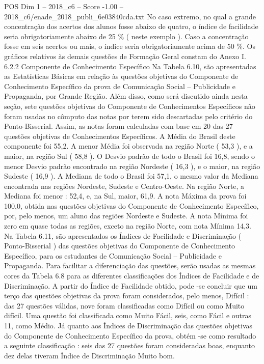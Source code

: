 \begin{textsample}{POS Dim 1 – 2018\_c6 – Score -1.00 – 2018\_c6/enade\_2018\_publi\_6e03840cda.txt}
No caso extremo, no qual a grande concentração dos acertos dos alunos fosse abaixo de quatro, o índice de facilidade seria obrigatoriamente abaixo de 25 \% ( neste exemplo ).
Caso a concentração fosse em seis acertos ou mais, o índice seria obrigatoriamente acima de 50 \%.
Os gráficos relativos às demais questões de Formação Geral constam do Anexo I. 6.2.2 Componente de Conhecimento Específico Na Tabela 6.10, são apresentadas as Estatísticas Básicas em relação às questões objetivas do Componente de Conhecimento Específico da prova de Comunicação Social – Publicidade e Propaganda, por Grande Região.
Além disso, como será discutido ainda nesta seção, sete questões objetivas do Componente de Conhecimentos Específicos não foram usadas no cômputo das notas por terem sido descartadas pelo critério do Ponto-Bisserial.
Assim, as notas foram calculadas com base em 20 das 27 questões objetivas de Conhecimentos Específicos.
A Média do Brasil deste componente foi 55,2.
A menor Média foi observada na região Norte ( 53,3 ), e a maior, na região Sul ( 58,8 ).
O Desvio padrão de todo o Brasil foi 16,8, sendo o menor Desvio padrão encontrado na região Nordeste ( 16,3 ), e o maior, na região Sudeste ( 16,9 ).
A Mediana de todo o Brasil foi 57,1, o mesmo valor da Mediana encontrada nas regiões Nordeste, Sudeste e Centro-Oeste.
Na região Norte, a Mediana foi menor : 52,4, e, na Sul, maior, 61,9.
A nota Máxima da prova foi 100,0, obtida nas questões objetivas do Componente de Conhecimento Específico, por, pelo menos, um aluno das regiões Nordeste e Sudeste.
A nota Mínima foi zero em quase todas as regiões, exceto na região Norte, com nota Mínima 14,3.
Na Tabela 6.11, são apresentados os Índices de Facilidade e Discriminação ( Ponto-Bisserial ) das questões objetivas do Componente de Conhecimento Específico, para os estudantes de Comunicação Social – Publicidade e Propaganda.
Para facilitar a diferenciação das questões, serão usadas as mesmas cores da Tabela 6.8 para as diferentes classificações dos Índices de Facilidade e de Discriminação.
A partir do Índice de Facilidade obtido, pode -se concluir que um terço das questões objetivas da prova foram considerados, pelo menos, Difícil : das 27 questões válidas, nove foram classificadas como Difícil ou como Muito difícil.
Uma questão foi classificada como Muito Fácil, seis, como Fácil e outras 11, como Médio.
Já quanto aos Índices de Discriminação das questões objetivas do Componente de Conhecimento Específico da prova, obtém -se como resultado a seguinte classificação : seis das 27 questões foram consideradas boas, enquanto dez delas tiveram Índice de Discriminação Muito bom.

\end{textsample}
